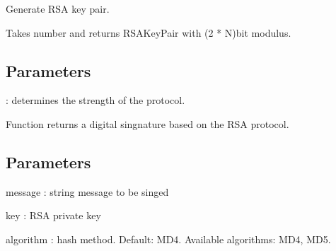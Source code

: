 \documentclass[letterpaper,10pt,english]{sphinxmanual}
\begin{document}

\begin{fulllineitems}
\label{\detokenize{todo_project_name:todo_project_name.rsa.rsa_key_gen}}
\pysigstartsignatures
{}
\pysigstopsignatures
\sphinxAtStartPar
Generate RSA key pair.

\sphinxAtStartPar
Takes number  and returns RSAKeyPair with (2 * N)\sphinxhyphen{}bit modulus.


\subsection{Parameters}
\label{\detokenize{todo_project_name:id6}}
\sphinxAtStartPar
{}
: determines the strength of the protocol.

\end{fulllineitems}


\begin{fulllineitems}
\label{\detokenize{todo_project_name:todo_project_name.rsa.rsa_sign}}
\pysigstartsignatures
{}
\pysigstopsignatures
\sphinxAtStartPar
Function returns a digital singnature based on the RSA protocol.


\subsection{Parameters}
\label{\detokenize{todo_project_name:id7}}
\sphinxAtStartPar
message
: string message to be singed

\sphinxAtStartPar
key
: RSA private key

\sphinxAtStartPar
algorithm
: hash method. Default: MD4.
Available algorithms: MD4, MD5.

\end{fulllineitems}
\end{document}
